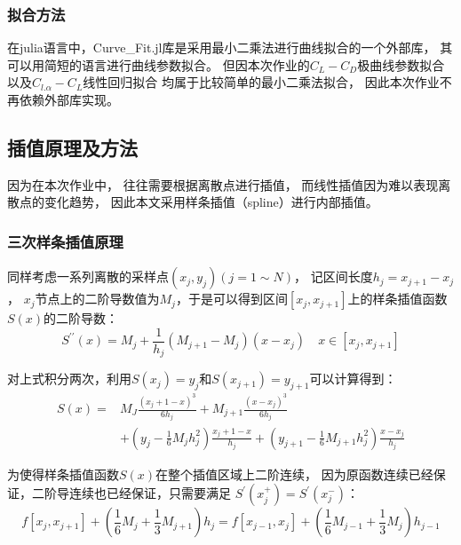 \subsubsection{拟合方法}

在julia语言中，Curve\_Fit.jl库是采用最小二乘法进行曲线拟合的一个外部库，
其可以用简短的语言进行曲线参数拟合。
但因本次作业的$C_L-C_D$极曲线参数拟合以及$C_{l.\alpha}-C_L$线性回归拟合
均属于比较简单的最小二乘法拟合，
因此本次作业不再依赖外部库实现。





\subsection{插值原理及方法}

因为在本次作业中，
往往需要根据离散点进行插值，
而线性插值因为难以表现离散点的变化趋势，
因此本文采用样条插值（spline）进行内部插值。

\subsubsection{三次样条插值原理}

同样考虑一系列离散的采样点$(x_j,y_j)(j=1\sim N)$，
记区间长度$h_j = x_{j+1} - x_{j}$，
$x_j$节点上的二阶导数值为$M_j$，于是可以得到区间$[x_j,x_{j+1}]$上的样条插值函数$S(x)$的二阶导数：
\begin{equation}
    S^{\prime\prime}(x) = M_j + \frac{1}{h_j}(M_{j+1} - M_j)(x - x_j)\quad x\in [x_j,x_{j+1}]
\end{equation}

对上式积分两次，利用$S(x_j) = y_j$和$S(x_{j+1}) = y_{j+1}$可以计算得到：
\begin{equation}
    \label{样条插值}
    \begin{aligned}
        S(x)=& M_J \frac{(x_j+1 - x)^3}{6h_j} + M_{j+1} \frac{(x-x_j)^3}{6h_j}\\
        & +\left( y_j - \frac{1}{6}M_j h_j^2 \right) \frac{x_j+1 - x}{h_j}
        +
        \left( y_{j+1} - \frac{1}{6}M_{j+1}h_j^2\right)\frac{x-x_j}{h_j}
    \end{aligned}
\end{equation}

为使得样条插值函数$S(x)$在整个插值区域上二阶连续，
因为原函数连续已经保证，二阶导连续也已经保证，只需要满足
$S^{\prime}(x_j^+) =S^{\prime}(x_j^-) $：
\begin{equation}
    f[x_j, x_{j+1}] + \left(\frac{1}{6}M_j + \frac{1}{3}M_{j+1}\right)h_j
    =
    f[x_{j-1}, x_j] + \left(\frac{1}{6}M_{j-1} + \frac{1}{3}M_j\right)h_{j-1}
\end{equation}

